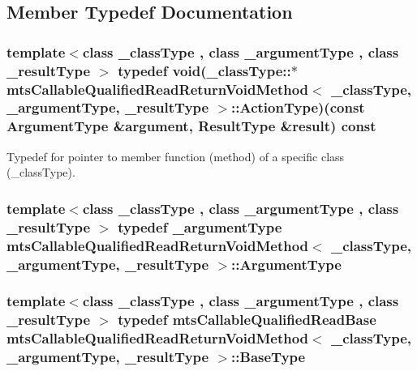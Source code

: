 \subsection{Member Typedef Documentation}
\hypertarget{classmts_callable_qualified_read_return_void_method_a7ac7450d5dce9ad80db720a370118211}{
\subsubsection[{Action\-Type}]{\setlength{\rightskip}{0pt plus 5cm}template$<$class \-\_\-class\-Type , class \-\_\-argument\-Type , class \-\_\-result\-Type $>$ typedef void(\-\_\-class\-Type\-::$\ast$ {\bf mts\-Callable\-Qualified\-Read\-Return\-Void\-Method}$<$ \-\_\-class\-Type, \-\_\-argument\-Type, \-\_\-result\-Type $>$\-::Action\-Type)(const {\bf Argument\-Type} \&argument, {\bf Result\-Type} \&result) const }}\label{classmts_callable_qualified_read_return_void_method_a7ac7450d5dce9ad80db720a370118211}
Typedef for pointer to member function (method) of a specific class (\-\_\-class\-Type). \hypertarget{classmts_callable_qualified_read_return_void_method_a6edb7e6ad0ead0f74cfe2751d45532c5}{
\subsubsection[{Argument\-Type}]{\setlength{\rightskip}{0pt plus 5cm}template$<$class \-\_\-class\-Type , class \-\_\-argument\-Type , class \-\_\-result\-Type $>$ typedef \-\_\-argument\-Type {\bf mts\-Callable\-Qualified\-Read\-Return\-Void\-Method}$<$ \-\_\-class\-Type, \-\_\-argument\-Type, \-\_\-result\-Type $>$\-::{\bf Argument\-Type}}}\label{classmts_callable_qualified_read_return_void_method_a6edb7e6ad0ead0f74cfe2751d45532c5}
\hypertarget{classmts_callable_qualified_read_return_void_method_ac485c35956ba406a7863f66264b290d4}{
\subsubsection[{Base\-Type}]{\setlength{\rightskip}{0pt plus 5cm}template$<$class \-\_\-class\-Type , class \-\_\-argument\-Type , class \-\_\-result\-Type $>$ typedef {\bf mts\-Callable\-Qualified\-Read\-Base} {\bf mts\-Callable\-Qualified\-Read\-Return\-Void\-Method}$<$ \-\_\-class\-Type, \-\_\-argument\-Type, \-\_\-result\-Type $>$\-::{\bf Base\-Type}}}\label{classmts_callable_qualified_read_return_void_method_ac485c35956ba406a7863f66264b290d4}
